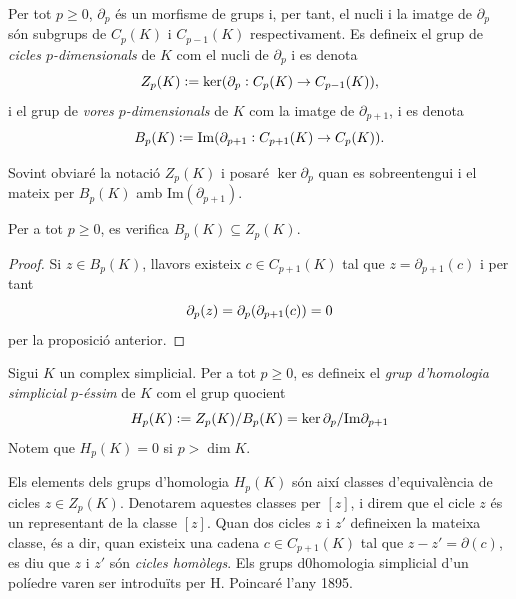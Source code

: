 \documentclass[../main.tex]{subfiles}
\begin{document}
Per tot $p\geq 0$, $\partial_p$ és un morfisme de grups i, per tant, el nucli i la imatge de $\partial_p$ són subgrups de $C_p(K)$ i $C_{p-1}(K)$ respectivament. Es defineix el grup de \textit{cicles $p$-dimensionals} de $K$ com el nucli de $\partial_p$ i es denota
\begin{equation}
    \notag
    Z_p(K) :=\ker(\partial_p:C_p(K)\rightarrow C_{p-1}(K)),
\end{equation}
i el grup de \textit{vores $p$-dimensionals} de $K$ com la imatge de $\partial_{p+1}$, i es denota
\begin{equation}
    \notag
    B_p(K):=\mathrm{Im}(\partial_{p+1}:C_{p+1}(K)\rightarrow C_p(K)).
\end{equation}

Sovint obviaré la notació $Z_p(K)$ i posaré $\ker\partial_p$ quan es sobreentengui i el mateix per $B_p(K)$ amb $\mathrm{Im}(\partial_{p+1})$.

\begin{lema}
\label{lema:bpinsidezp} Per a tot $p\geq 0$, es verifica $B_p(K)\subseteq Z_p(K)$.
\end{lema}
\begin{proof}
Si $z\in B_p(K)$, llavors existeix $c\in C_{p+1}(K)$ tal que $z = \partial_{p+1}(c)$ i per tant
\begin{equation}
    \notag
    \partial_p(z) = \partial_p(\partial_{p+1}(c)) = 0
\end{equation}
per la proposició anterior.
\end{proof}

\begin{defi}
 Sigui $K$ un complex simplicial. Per a tot $p\geq 0$, es defineix el \textit{grup d'homologia simplicial $p$-éssim} de $K$ com el grup quocient
\begin{equation}
    \notag
    H_p(K):=Z_p(K)/B_p(K) = \ker\partial_p / \mathrm{Im}\partial_{p+1}
\end{equation}
Notem que $H_p(K) = 0$ si $p>\dim K$.
\end{defi}

Els elements dels grups d'homologia $H_p(K)$ són així classes d'equivalència de cicles $z\in Z_p(K)$. Denotarem aquestes classes per $[z]$, i direm que el cicle $z$ és un representant de la classe $[z]$. Quan dos cicles $z$ i $z'$ defineixen la mateixa classe, és a dir, quan existeix una cadena $c\in C_{p+1}(K)$ tal que $z-z' = \partial(c)$, es diu que $z$ i $z'$ són \textit{cicles homòlegs}. Els grups d0homologia simplicial d'un políedre varen ser introduïts per H. Poincaré l'any 1895.
\end{document}
